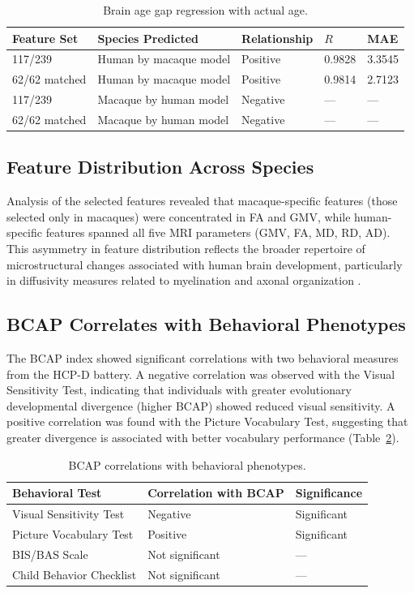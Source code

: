 \documentclass[12pt]{article}
\begin{document}
\begin{table}[H]
\centering
\caption{Brain age gap regression with actual age.}
\label{tab:gap}
\begin{tabular}{lllll}
\toprule
Feature Set & Species Predicted & Relationship & $R$ & MAE \\
\midrule
117/239 & Human by macaque model & Positive & 0.9828 & 3.3545 \\
62/62 matched & Human by macaque model & Positive & 0.9814 & 2.7123 \\
117/239 & Macaque by human model & Negative & --- & --- \\
62/62 matched & Macaque by human model & Negative & --- & --- \\
\bottomrule
\end{tabular}
\end{table}

\subsection{Feature Distribution Across Species}

Analysis of the selected features revealed that macaque-specific features (those selected only in macaques) were concentrated in FA and GMV, while human-specific features spanned all five MRI parameters (GMV, FA, MD, RD, AD). This asymmetry in feature distribution reflects the broader repertoire of microstructural changes associated with human brain development, particularly in diffusivity measures related to myelination and axonal organization \citep{lebel2012diffusion}.

\subsection{BCAP Correlates with Behavioral Phenotypes}

The BCAP index showed significant correlations with two behavioral measures from the HCP-D battery. A negative correlation was observed with the Visual Sensitivity Test, indicating that individuals with greater evolutionary developmental divergence (higher BCAP) showed reduced visual sensitivity. A positive correlation was found with the Picture Vocabulary Test, suggesting that greater divergence is associated with better vocabulary performance (Table~\ref{tab:behavior}).

\begin{table}[H]
\centering
\caption{BCAP correlations with behavioral phenotypes.}
\label{tab:behavior}
\begin{tabular}{lll}
\toprule
Behavioral Test & Correlation with BCAP & Significance \\
\midrule
Visual Sensitivity Test & Negative & Significant \\
Picture Vocabulary Test & Positive & Significant \\
BIS/BAS Scale & Not significant & --- \\
Child Behavior Checklist & Not significant & --- \\
\bottomrule
\end{tabular}
\end{table}
\end{document}
